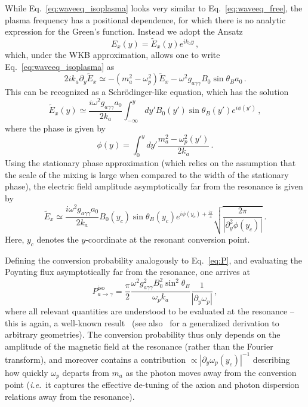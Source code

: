 \documentclass[twocolumn,superscriptaddress,floatfix,preprintnumbers,prd,nofootinbib,aps,10pt]{revtex4-2}
\renewcommand\({\left(}
\renewcommand\){\right)}
\renewcommand\[{\left[}
\renewcommand\]{\right]}
\newcommand\ie{{\it i.e.}~}
\begin{document}
While Eq.~\ref{eq:waveeq_isoplasma} looks very similar to Eq.~\ref{eq:waveeq_free}, the plasma frequency has a positional dependence, for which there is no analytic expression for the Green's function. Instead we adopt the Ansatz
%
\begin{equation}\label{eq:E_iso_ansatz}
    E_x(y) = \tilde{E}_x(y) e^{i k_a y} \, ,
\end{equation}
%
which, under the WKB approximation, allows one to write Eq.~\ref{eq:waveeq_isoplasma} as
%
\begin{equation}
    2 i k_a \partial_y \tilde{E}_x \simeq -(m_a^2 - \omega_p^2) \tilde{E}_x -\omega^2 g_{a\gamma\gamma} B_0 \sin \theta_B a_0 \, .
\end{equation}
%
This can be recognized as a Schr\"{o}dinger-like equation, which has the solution
%
\begin{equation}
    \tilde{E}_x(y) \simeq \frac{i \omega^2 g_{a\gamma\gamma} a_0}{2 k_a} \int_{-\infty}^y dy' B_0(y') \sin\theta_B(y') e^{i \phi(y')} \, ,
\end{equation}
%
where the phase is given by
%
\begin{equation}
    \phi(y) = \int_0^y dy' \frac{m_a^2 - \omega_p^2(y')}{2 k_a} \, .
\end{equation}
%
Using the stationary phase approximation (which relies on the assumption that the scale of the mixing is large when compared to the width of the stationary phase), the electric field amplitude asymptotically far from the resonance is given by
%
\begin{equation}
    \tilde{E}_x \simeq \frac{i \omega^2 g_{a\gamma\gamma} a_0}{2 k_a} B_0(y_c) \sin \theta_B(y_c) e^{i \phi(y_c) + \frac{i \pi}{4}} \sqrt{\frac{2 \pi}{|\partial_y^2 \phi (y_c)|}} \, .
\end{equation}
%
Here, $y_c$ denotes the $y$-coordinate at the resonant conversion point.

Defining the conversion probability analogously to Eq.~\ref{eq:P}, and evaluating the Poynting flux asymptotically far from the resonance, one arrives at
%
\begin{equation}\label{eq:prob_iso}
    P_{a \rightarrow \gamma}^\textrm{iso} = \frac{\pi}{2} \frac{\omega^2 g_{a\gamma\gamma}^2 B_0^2 \sin^2 \theta_B}{\omega_p k_a} \frac{1}{|\partial_y \omega_p|} \, ,
\end{equation}
%
where all relevant quantities are understood to be evaluated at the resonance -- this is again, a well-known result~\cite{Raffelt:1987im} (see also~\cite{Battye:2019aco} for a generalized derivation to arbitrary geometries). The conversion probability thus only depends on the amplitude of the magnetic field at the resonance (rather than the Fourier transform), and moreover contains a contribution $\propto |\partial_y \omega_p(y_c)|^{-1}$ describing how quickly $\omega_p$ departs from $m_a$ as the photon moves away from the conversion point (\ie it captures the effective de-tuning of the axion and photon dispersion relations away from the resonance). 
\end{document}
